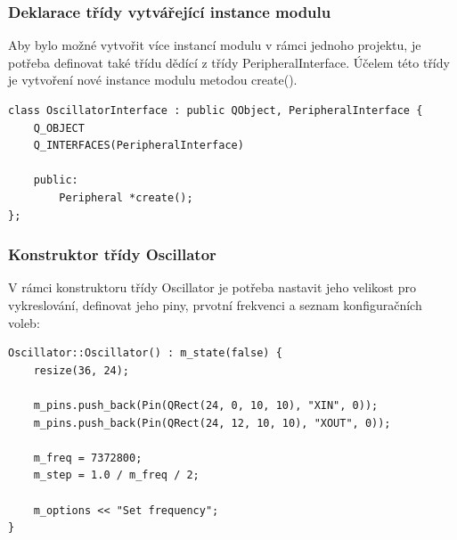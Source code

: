 \subsubsection{Deklarace třídy vytvářející instance modulu}

Aby bylo možné vytvořit více instancí modulu v rámci jednoho projektu, je potřeba definovat také třídu dědící z třídy PeripheralInterface. Účelem této třídy je vytvoření nové instance modulu metodou create().

\begin{lstlisting}
class OscillatorInterface : public QObject, PeripheralInterface {
	Q_OBJECT
	Q_INTERFACES(PeripheralInterface)

	public:
		Peripheral *create();
};
\end{lstlisting}

\subsubsection{Konstruktor třídy Oscillator}

V rámci konstruktoru třídy Oscillator je potřeba nastavit jeho velikost pro vykreslování, definovat jeho piny, prvotní frekvenci a seznam konfiguračních voleb:

\begin{lstlisting}
Oscillator::Oscillator() : m_state(false) {
	resize(36, 24);

	m_pins.push_back(Pin(QRect(24, 0, 10, 10), "XIN", 0));
	m_pins.push_back(Pin(QRect(24, 12, 10, 10), "XOUT", 0));

	m_freq = 7372800;
	m_step = 1.0 / m_freq / 2;

	m_options << "Set frequency";
}
\end{lstlisting}

